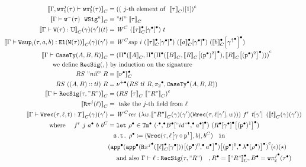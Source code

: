 \begin{align*}
  \denotesC{\goodType{\Gm, \wsigproj{j}{1}{\wsig}}{\wsigproj{j}{2}{\wsig}}{}} &= \Gmodel{(\text{ $j$-th element of }~\denotesC{\wsig})[1]}\\
  \denotesC{\goodWSig{\Gm}{\WSigSub{\wsig}}{n}} &= "tl"~\denotesC{\wsig}\\
  \denotesC{\goodTerm{\Gm}{\wcode{\wsig}}{\cU}}(\gm)(\gm')(t) &= \CWmodel~(\Gsub{\denotesCC{\wsig}}{\Glued{\gm}})~t \\
  \denotesC{\goodTerm{\Gm}{\Wsup{i}{\wsig}{a}{b}}{\El{\wcode{\wsig}}}}(\gm)(\gm') &= \CWsup~i~(\Gsub{\denotesCC{\wsig}}{\Glued{\gm}})~(\Gsub{\denotesCC{a}}{\Glued{\gm}})~(\Gsub{\denotesCC{b}}{{\Glued{\gm^\uparrow}}}) \\
  \denotesC{\goodType{\Gm}{\CaseSig{A}{B}{R}}{}} &= 
  \Gmodel{\GluedPi{\denotesC{A}}{\GluedPi {\GluedPi{\denotesC{B}}{\Gsub{\denotesC{R}}{\GSubstWeak{2}}}} {\Gsub{\denotesC{R}}{\GSubstWeak{2}}}}} \\
  \text{we define } \RecSig{}{} &\text{ by induction on the signature} \\
  RS~"nil"~R &= \denotesCC{\LSigEmp} \\
  RS~((A, B) :: tl)~R &= \GLSigAdd{RS~tl~R}{\Glued{\pi_2}}{\GCaseSig{A}{B}{R}} \\
  \denotesC{\goodType{\Gm}{\RecSig{\wsig}{"R"}}{}} &= \Gmodel{RS~\denotesC{\tau}~\denotesC{"R"}} \\
  \denotesC{\Recproj{j}{\lkg}} &= \text{ take the $j$-th field from } \lkg \\
  \denotesC{\goodTerm{\Gm}{\Wrec{\wsig}{\lkg}{t}}{T}}(\gm)(\gm') &= \CWrec~(\lambda w. \denotesC{"R"}(\gm)(\gm')(\Wrec{\wsig}{\sub{\lkg}{\gm'}}{w}))~f^r~\sub{t}{\gm'}~(\denotesC{t}(\gm)(\gm')) \\
  \text{ where } \quad f^r~j~\Glued{a}~b~b^C &= 
  \texttt{let}~\Glued{\rho}  \in \GTm{(\Glued{\cdot} \Glued{,} \Gsub{\Glued{B}}{\GSubstExt{\Glued{"id"}}{\Glued{a}}})}{(\Gsub{\Gsub{\Glued{R}}{\Glued{\gm}}}{\GSubstWeak{1}})} 
  \\
  & \ \texttt{ s.t.}~\Glued{\rho} \coloneq (\Wrec{\wsig}{\sub{\lkg}{\SubstComp{\gm}{\SubstWeak{1}}}}{b},b^C)~\texttt{ in } \\
  & \Gmodel{\Gsub{\Gapp{\Gsub{\Gapp{\GRecproj{j}{\sub{\denotesCC{\lkg}}{\Glued{\gm}}}}}{\GSubstExt{\GSubstId}{\Glued{a}}}}}{\GSubstExt{\GSubstId}{\Glam{\Glued{\rho}}}}}(\epsilon)(\star) \\
  & \quad 
   \text{ and also } \goodTerm{\Gm}{\lkg}{\RecSig{\wsig}{"R"}} \quad ,\Glued{R} = \denotesCC{"R"}, \Glued{B} = \Gwsigproj{j}{2}{\Glued{\wsig}}
\end{align*}

